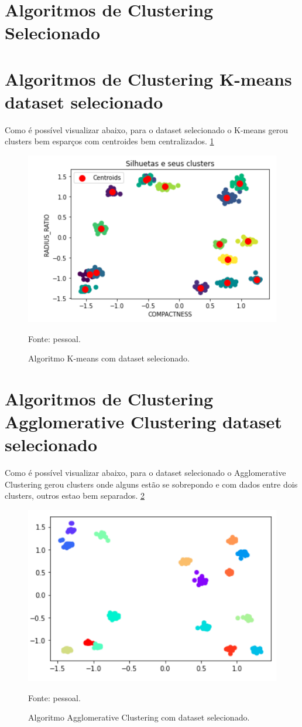 \section{Algoritmos de Clustering Selecionado}

\section{Algoritmos de Clustering K-means dataset selecionado}

Como é possível visualizar abaixo, para o dataset selecionado o K-means gerou clusters bem esparços com centroides bem centralizados. \ref{fig:dim128_kmeans_selecionado}

\begin{figure}[h]
	\centering
	\includegraphics[width=0.7\linewidth]{images/kmeansSelecionado}
	\caption{Algoritmo K-means com dataset selecionado.}
	Fonte: pessoal.
	\label{fig:dim128_kmeans_selecionado}
\end{figure}

\section{Algoritmos de Clustering Agglomerative Clustering dataset selecionado}

Como é possível visualizar abaixo, para o dataset selecionado o Agglomerative Clustering gerou clusters onde alguns estão se sobrepondo e com dados entre dois clusters, outros estao bem separados. \ref{fig:dim128_agglomerative_selecionado}

\begin{figure}[h]
	\centering
	\includegraphics[width=0.7\linewidth]{images/dim128_agglomerative_selecionado}
	\caption{Algoritmo Agglomerative Clustering com dataset selecionado.}
	Fonte: pessoal.
	\label{fig:dim128_agglomerative_selecionado}
\end{figure}


